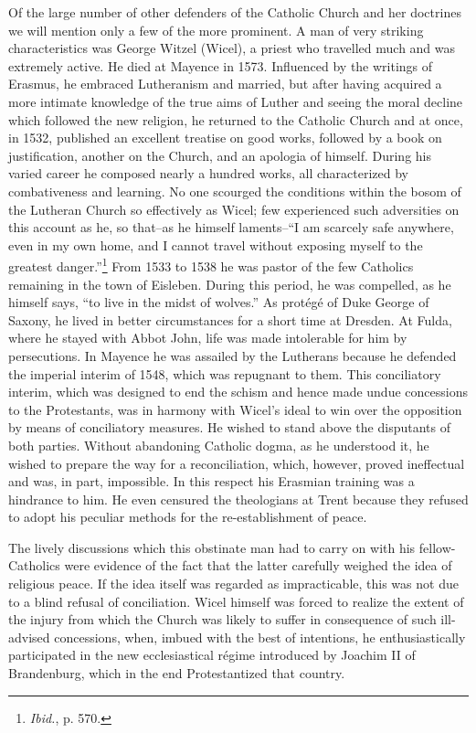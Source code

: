 Of the large number of other defenders of the Catholic Church
and her doctrines we will mention only a few of the more prominent.
A man of very striking characteristics was George Witzel (Wicel), a
priest who travelled much and was extremely active. He died at Mayence
in 1573. Influenced by the writings of Erasmus, he embraced
Lutheranism and married, but after having acquired a more intimate
knowledge of the true aims of Luther and seeing the moral decline
which followed the new religion, he returned to the Catholic Church
and at once, in 1532, published an excellent treatise on good works,
followed by a book on justification, another on the Church, and an
apologia of himself. During his varied career he composed nearly a
hundred works, all characterized by combativeness and learning. No
one scourged the conditions within the bosom of the Lutheran Church
so effectively as Wicel; few experienced such adversities on this
account as he, so that--as he himself laments--``I am scarcely safe
anywhere, even in my own home, and I cannot travel without exposing myself
to the greatest danger.''\footnote{\textit{Ibid.}, p. 570.}
 From 1533 to 1538 he was
pastor of the few Catholics remaining in the town of Eisleben. During
this period, he was compelled, as he himself says, “to live in the
midst of wolves.” As protégé of Duke George of Saxony, he lived in
better circumstances for a short time at Dresden. At Fulda, where he
stayed with Abbot John, life was made intolerable for him by persecutions.
In Mayence he was assailed by the Lutherans because he defended the imperial
interim of 1548, which was repugnant to them.
This conciliatory interim, which was designed to end the schism and
hence made undue concessions to the Protestants, was in harmony
with Wicel’s ideal to win over the opposition by means of conciliatory
measures. He wished to stand above the disputants of both parties. Without
abandoning Catholic dogma, as he understood it, he
wished to prepare the way for a reconciliation, which, however,
proved ineffectual and was, in part, impossible. In this respect his
Erasmian training was a hindrance to him. He even censured the
theologians at Trent because they refused to adopt his peculiar methods
for the re-establishment of peace.

The lively discussions which this obstinate man had to carry on
with his fellow-Catholics were evidence of the fact that the latter
carefully weighed the idea of religious peace. If the idea itself was
regarded as impracticable, this was not due to a blind refusal of
conciliation. Wicel himself was forced to realize the extent of the
injury from which the Church was likely to suffer in consequence of
such ill-advised concessions, when, imbued with the best of intentions,
he enthusiastically participated in the new ecclesiastical régime introduced
by Joachim II of Brandenburg, which in the end Protestantized that country.

